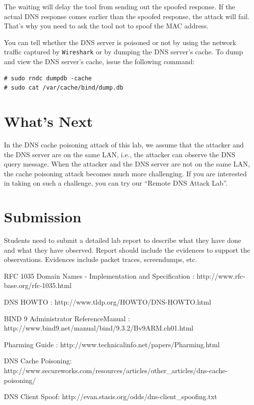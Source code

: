 The waiting will delay the tool from sending out the spoofed 
response. If the actual DNS response comes earlier than the spoofed response,
the attack will fail. That's why you need to ask the tool not to spoof the 
MAC address.


You can tell whether the DNS server is poisoned or not by using the network 
traffic captured by {\tt Wireshark} or by
dumping the DNS server's cache. To dump and view the DNS server's cache, issue
the following command:
\begin{verbatim}
# sudo rndc dumpdb -cache
# sudo cat /var/cache/bind/dump.db
\end{verbatim}


\section{What's Next}


In the DNS cache poisoning attack of this lab, 
we assume that the attacker and the DNS server are on
the same LAN, i.e., the attacker can observe the DNS query message.
When the attacker and the DNS server are not on the same LAN,
the cache poisoning attack becomes much more challenging. If you
are interested in taking on such a challenge, you can 
try our ``Remote DNS Attack Lab''.




\section{Submission}

Students need to submit a detailed lab report to describe what they have done and
what they have observed. Report should include the evidences to support 
the observations. Evidences include packet traces, screendumps, etc.
 
\begin{thebibliography}{10}

RFC 1035 Domain Names - Implementation and Specification :
\newblock http://www.rfc-base.org/rfc-1035.html

DNS HOWTO :
\newblock http://www.tldp.org/HOWTO/DNS-HOWTO.html

BIND 9 Administrator ReferenceManual :
\newblock http://www.bind9.net/manual/bind/9.3.2/Bv9ARM.ch01.html

Pharming Guide :
\newblock http://www.technicalinfo.net/papers/Pharming.html

DNS Cache Poisoning:
\newblock http://www.secureworks.com/resources/articles/other\_articles/dns-cache-poisoning/

DNS Client Spoof:
\newblock http://evan.stasis.org/odds/dns-client\_spoofing.txt


\end{thebibliography}

